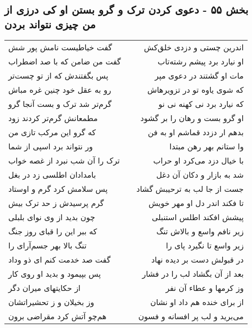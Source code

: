 \begin{center}
\section*{بخش ۵۵ - دعوی کردن ترک و گرو بستن او کی درزی از من چیزی نتواند بردن}
\label{sec:sh055}
\begin{longtable}{l p{0.5cm} r}
گفت خیاطیست نامش پور شش
&&
اندرین چستی و دزدی خلق‌کش
\\
گفت من ضامن که با صد اضطراب
&&
او نیارد برد پیشم رشته‌تاب
\\
پس بگفتندش که از تو چست‌تر
&&
مات او گشتند در دعوی مپر
\\
رو به عقل خود چنین غره مباش
&&
که شوی یاوه تو در تزویرهاش
\\
گرم‌تر شد ترک و بست آنجا گرو
&&
که نیارد برد نی کهنه نی نو
\\
مطمعانش گرم‌تر کردند زود
&&
او گرو بست و رهان را بر گشود
\\
که گرو این مرکب تازی من
&&
بدهم ار دزدد قماشم او به فن
\\
ور نتواند برد اسپی از شما
&&
وا ستانم بهر رهن مبتدا
\\
ترک را آن شب نبرد از غصه خواب
&&
با خیال دزد می‌کرد او حراب
\\
بامدادان اطلسی زد در بغل
&&
شد به بازار و دکان آن دغل
\\
پس سلامش کرد گرم و اوستاد
&&
جست از جا لب به ترحیبش گشاد
\\
گرم پرسیدش ز حد ترک بیش
&&
تا فکند اندر دل او مهر خویش
\\
چون بدید از وی نوای بلبلی
&&
پیشش افکند اطلس استنبلی
\\
که ببر این را قبای روز جنگ
&&
زیر نافم واسع و بالاش تنگ
\\
تنگ بالا بهر جسم‌آرای را
&&
زیر واسع تا نگیرد پای را
\\
گفت صد خدمت کنم ای ذو وداد
&&
در قبولش دست بر دیده نهاد
\\
پس بپیمود و بدید او روی کار
&&
بعد از آن بگشاد لب را در فشار
\\
از حکایتهای میران دگر
&&
وز کرمها و عطاء آن نفر
\\
وز بخیلان و ز تحشیراتشان
&&
از برای خنده هم داد او نشان
\\
هم‌چو آتش کرد مقراضی برون
&&
می‌برید و لب پر افسانه و فسون
\\
\end{longtable}
\end{center}
